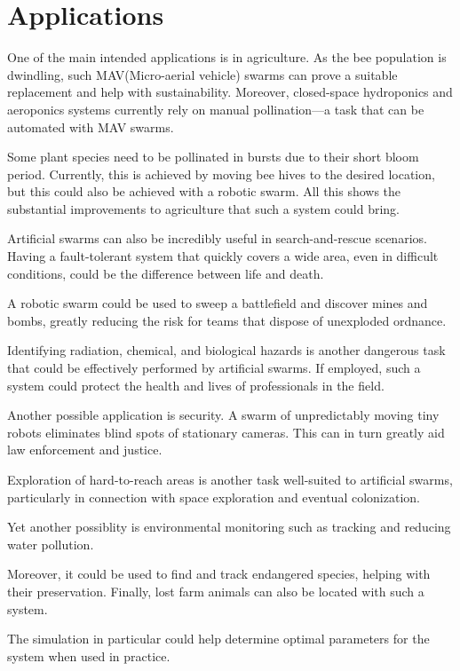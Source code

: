 \section{Applications}
\label{subsec:applications}
One of the main intended applications is in agriculture. As the bee population is dwindling, such MAV(Micro-aerial vehicle) swarms can prove a suitable replacement and help with sustainability. Moreover, closed-space hydroponics and aeroponics systems currently rely on manual pollination---a task that can be automated with MAV swarms. 
\par Some plant species need to be pollinated in bursts due to their short bloom period. Currently, this is achieved by moving bee hives to the desired location, but this could also be achieved with a robotic swarm. All this shows the substantial improvements to agriculture that such a system could bring.
\par Artificial swarms can also be incredibly useful in search-and-rescue scenarios. Having a fault-tolerant system that quickly covers a wide area, even in difficult conditions, could be the difference between life and death.   
\par A robotic swarm could be used to sweep a battlefield and discover mines and bombs, greatly reducing the risk for teams that dispose of unexploded ordnance.
\par Identifying radiation, chemical, and biological hazards is another dangerous task that could be effectively performed by artificial swarms. If employed, such a system could protect the health and lives of professionals in the field. 
\par Another possible application is security. A swarm of unpredictably moving tiny robots eliminates blind spots of stationary cameras. This can in turn greatly aid law enforcement and justice. 
\par Exploration of hard-to-reach areas is another task well-suited to artificial swarms, particularly in connection with space exploration and eventual colonization.
\par Yet another possiblity is environmental monitoring such as tracking and reducing water pollution.
\par Moreover, it could be used to find and track endangered species, helping with their preservation. Finally, lost farm animals can also be located with such a system. 
\par The simulation in particular could help determine optimal parameters for the system when used in practice.  

